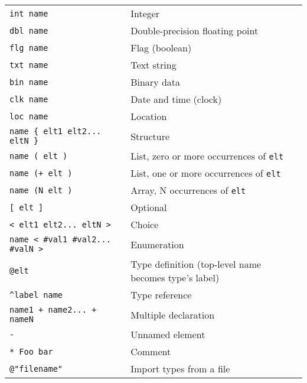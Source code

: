 \documentclass[12pt,a4paper,twoside]{article}
\renewcommand{\_}{\texttt{\symbol{95}}}
\begin{document}
\begin{tabular}{ll}
\verb^int name^                    & Integer\\
\verb^dbl name^                    & Double-precision floating point\\
\verb^flg name^                    & Flag (boolean)\\
\verb^txt name^                    & Text string\\
\verb^bin name^                    & Binary data\\
\verb^clk name^                    & Date and time (clock)\\
\verb^loc name^                    & Location\\
\verb^name { elt1 elt2... eltN }^  & Structure\\
\verb^name ( elt )^                & List, zero or more occurrences of \verb^elt^\\
\verb^name (+ elt )^               & List, one or more occurrences of \verb^elt^\\
\verb^name (N elt )^               & Array, N occurrences of \verb^elt^\\
\verb^[ elt ]^                     & Optional\\
\verb^< elt1 elt2... eltN >^       & Choice\\
\verb^name < #val1 #val2... #valN >^ & Enumeration\\
\verb^@elt^                        & Type definition (top-level name becomes type's label)\\
\verb~^label name~                 & Type reference\\
\verb^name1 + name2... + nameN^    & Multiple declaration\\
\verb^-^                           & Unnamed element\\
\verb^* Foo bar^                   & Comment\\
\verb^@"filename"^                 & Import types from a file\\
\end{tabular}
\end{document}
